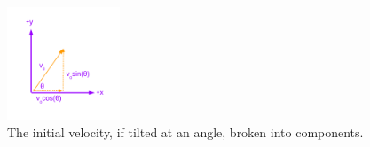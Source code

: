 \documentclass{article}
\begin{document}
\begin{figure}[hb]
\centering
\includegraphics[width=0.3\textwidth,trim=0cm 1cm 0cm 1cm,clip=true]{figures/Vectors1.pdf}
\caption{\label{fig:1} The initial velocity, if tilted at an angle, broken into components.}
\end{figure}
\end{document}

